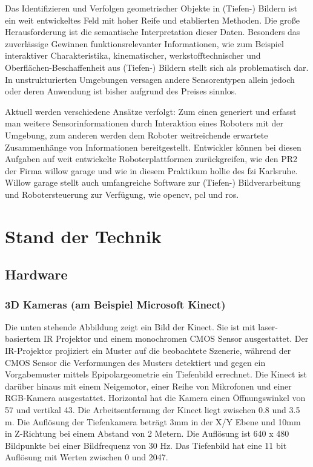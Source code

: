Das Identifizieren und Verfolgen geometrischer Objekte in (Tiefen-) Bildern ist ein weit entwickeltes Feld mit hoher Reife und etablierten Methoden.
 Die große Herausforderung ist die semantische Interpretation dieser Daten. Besonders das zuverlässige Gewinnen funktionsrelevanter Informationen,
 wie zum Beispiel interaktiver Charakteristika, kinematischer, werkstofftechnischer und  Oberflächen-Beschaffenheit aus (Tiefen-) Bildern stellt sich
 als problematisch dar. In unstrukturierten Umgebungen versagen andere Sensorentypen allein jedoch oder deren Anwendung ist bisher aufgrund des Preises sinnlos.
 
Aktuell werden verschiedene Ansätze verfolgt: Zum einen generiert und erfasst man weitere Sensorinformationen durch Interaktion eines Roboters mit der Umgebung,
 zum anderen werden dem Roboter weitreichende erwartete Zusammenhänge von Informationen bereitgestellt. Entwickler können bei diesen Aufgaben auf weit entwickelte Roboterplattformen
 zurückgreifen, wie den PR2 der Firma willow garage und wie in diesem Praktikum
 \gls{hollie} des \gls{fzi} Karlsruhe. Willow garage stellt auch umfangreiche
 Software zur (Tiefen-) Bildverarbeitung und Robotersteuerung zur Verfügung,
 wie \gls{opencv}, \gls{pcl} und \gls{ros}.

\section{Stand der Technik}
\label{stand_der_technik_sec}
\authorsection{\editordummy}

\subsection{Hardware}
\subsubsection{3D Kameras (am Beispiel Microsoft Kinect)}
Die unten stehende Abbildung zeigt ein Bild der Kinect. Sie ist mit laser-basiertem IR Projektor und einem monochromen CMOS Sensor ausgestattet. Der IR-Projektor projiziert ein Muster auf die beobachtete Szenerie, während der CMOS Sensor die Verformungen des Musters detektiert und gegen ein Vorgabemuster mittels Epipolargeometrie ein Tiefenbild errechnet. Die Kinect ist darüber hinaus mit einem Neigemotor, einer Reihe von Mikrofonen und einer RGB-Kamera ausgestattet. Horizontal hat die Kamera einen Öffnungswinkel von 57 und vertikal 43. Die Arbeitsentfernung der Kinect liegt zwischen 0.8 und 3.5 m. Die Auflösung der Tiefenkamera beträgt 3mm in der X/Y Ebene und 10mm in Z-Richtung bei einem Abstand von 2 Metern. Die Auflösung ist 640 x 480 Bildpunkte bei einer Bildfrequenz von 30 Hz. Das Tiefenbild hat eine 11 bit Auflösung mit Werten zwischen 0 und 2047.

